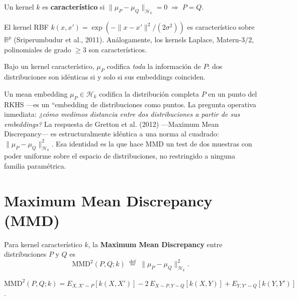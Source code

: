 \begin{definition}
	Un kernel $k$ es \textbf{característico} si
	$\|\mu_P - \mu_Q\|_{\mathcal{H}_k} = 0 \;\Rightarrow\; P = Q$.
\end{definition}

\begin{theorem}
	\label{thm:char-kernel}
	El kernel RBF $k(x,x') = \exp(-\|x-x'\|^2/(2\sigma^2))$ es característico
	sobre $\mathbb{R}^p$ (Sriperumbudur et al., 2011).  Análogamente, los
	kernels Laplace, Matern-$3/2$, polinomiales de grado $\ge 3$ son
	característicos.
\end{theorem}

\begin{corollary}
	Bajo un kernel característico, $\mu_P$ codifica \emph{toda} la
	información de $P$: dos distribuciones son idénticas si y solo si sus
	embeddings coinciden.
\end{corollary}


\bigskip
\noindent
Un mean embedding $\mu_P \in \mathcal{H}_k$ codifica la distribución completa $P$ en un punto del RKHS ---es un ``embedding de distribuciones como puntos. La pregunta operativa inmediata: \emph{¿cómo medimos distancia entre dos distribuciones a partir de sus embeddings?} La respuesta de Gretton et al. (2012) ---Maximum Mean Discrepancy--- es estructuralmente idéntica a una norma al cuadrado: $\|\mu_P - \mu_Q\|_{\mathcal{H}_k}^2$. Esa identidad es la que hace MMD un test de dos muestras con poder uniforme sobre el espacio de distribuciones, no restringido a ninguna familia paramétrica.

\section{Maximum Mean Discrepancy (MMD)}

\begin{definition}[MMD]
	\label{def:mmd}
	Para kernel característico $k$, la \textbf{Maximum Mean Discrepancy}
	entre distribuciones $P$ y $Q$ es
	\[
	\mathrm{MMD}^2(P, Q; k) \;\stackrel{\text{def}}{=}\;
	\| \mu_P - \mu_Q \|^2_{\mathcal{H}_k}.
	\]
\end{definition}

\begin{proposition}
	$\mathrm{MMD}^2(P, Q; k) = E_{X,X'\sim P}[k(X,X')]
	- 2\,E_{X\sim P, Y\sim Q}[k(X,Y)] + E_{Y,Y'\sim Q}[k(Y,Y')]$.
\end{proposition}

